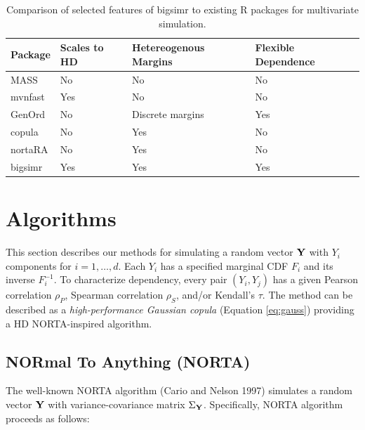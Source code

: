 \documentclass{article}
\begin{document}
\begin{table}[h]
\centering
\caption{\label{tab:compare-table}Comparison of selected features of bigsimr to existing R packages for multivariate simulation.}
\begin{tabular}{@{}llll@{}}
Package & Scales to HD & Hetereogenous Margins & Flexible Dependence \\ \midrule
MASS      & No           & No                    & No                  \\
mvnfast   & Yes          & No                    & No                  \\
GenOrd    & No           & Discrete margins      & Yes                 \\
copula    & No           & Yes                   & No                  \\
nortaRA   & No           & Yes                   & No                  \\
bigsimr   & Yes          & Yes                   & Yes                
\end{tabular}
\end{table}

\hypertarget{algorithms}{%
\section{Algorithms}\label{algorithms}}

This section describes our methods for simulating a random vector
\(\bf Y\) with \(Y_i\) components for \(i=1,\ldots,d\). Each \(Y_i\) has
a specified marginal CDF \(F_i\) and its inverse \(F^{-1}_i\). To
characterize dependency, every pair \((Y_i, Y_j)\) has a given Pearson
correlation \(\rho_P\), Spearman correlation \(\rho_S\), and/or
Kendall's \(\tau\). The method can be described as a
\emph{high-performance Gaussian copula} (Equation \ref{eq:gauss})
providing a HD NORTA-inspired algorithm.

\hypertarget{normal-to-anything-norta}{%
\subsection{NORmal To Anything (NORTA)}\label{normal-to-anything-norta}}

The well-known NORTA algorithm (Cario and Nelson 1997) simulates a
random vector \(\bf Y\) with variance-covariance matrix
\(\Sigma_{\bf Y}\). Specifically, NORTA algorithm proceeds as follows:
\end{document}
